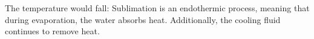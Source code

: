 The temperature would fall: Sublimation is an endothermic process, meaning that during evaporation, the water absorbs heat. Additionally, the cooling fluid continues to remove heat.